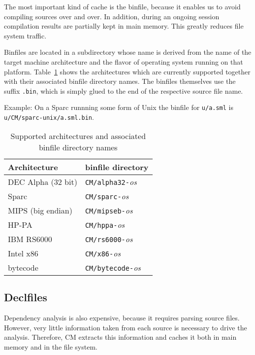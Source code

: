 \documentclass{article}
\begin{document}
The most important kind of cache is the binfile, because it enables us
to avoid compiling sources over and over.  In addition, during an
ongoing session compilation results are partially kept in main
memory. This greatly reduces file system traffic.

Binfiles are located in a subdirectory whose name is derived
from the name of the target machine architecture and the flavor of
operating system running on that platform.
Table~\ref{tab:arch} shows the architectures which are currently
supported together with their associated binfile directory names.
The binfiles themselves use the suffix {\tt .bin}, which is simply
glued to the end of the respective source file name.

Example: On a Sparc runnning some form of {\sc Unix} the binfile for
{\tt u/a.sml} is {\tt u/CM/sparc-unix/a.sml.bin}.

\begin{table}
\begin{center}
\begin{tabular}{|ll|}
\hline
Architecture & binfile directory \\
\hline
DEC Alpha (32 bit) & {\tt CM/alpha32-}{\it os} \\
Sparc & {\tt CM/sparc-}{\it os} \\
MIPS (big endian) & {\tt CM/mipseb-}{\it os} \\
HP-PA & {\tt CM/hppa-}{\it os} \\
IBM RS6000 & {\tt CM/rs6000-}{\it os} \\
Intel x86 & {\tt CM/x86-}{\it os} \\
bytecode & {\tt CM/bytecode-}{\it os} \\
\hline
\end{tabular}
\end{center}
\caption{Supported architectures and associated binfile directory names}
\label{tab:arch}
\end{table}

\subsection{Declfiles}

Dependency analysis is also expensive, because it requires parsing
source files.  However, very little information taken from each source
is necessary to drive the analysis.  Therefore, CM extracts this
information and caches it both in main memory and in the file system.
\end{document}
